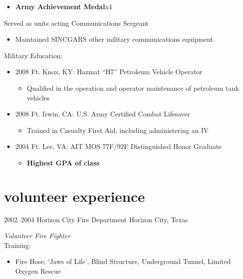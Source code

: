 \documentclass[]{friggeri-cv} %
\begin{document}
\begin{entrylist}
{\begin{itemize}
\item \textbf{Army Achievement Medal}x4
\end{itemize}
Served as units acting Communications Sergeant
\begin{itemize}
\item Maintained SINCGARS other military communications equipment.
\end{itemize}
Military Education:
\begin{itemize}
\item 2008 Ft. Knox, KY: Hazmat “H7” Petroleum Vehicle Operator
\begin{itemize}
\item Qualified in the operation and operator maintenance of petroleum tank vehicles
\end{itemize}
\item 2008 Ft. Irwin, CA: U.S. Army Certified Combat Lifesaver
\begin{itemize}
\item Trained in Casualty First Aid, including administering an IV
\end{itemize}
\item 2004 Ft. Lee, VA: AIT MOS 77F/92F Distinguished Honor Graduate
\begin{itemize}
\item \textbf{Highest GPA of class}
\end{itemize}
\end{itemize}}
\end{entrylist}



\section{volunteer experience}

\begin{entrylist}
\entry
{2002--2004}
{Horizon City Fire Department}
{Horizon City, Texas}
{\emph{Volunteer Fire Fighter} \\
Training:
\begin{itemize}
\item Fire Hose, ‘Jaws of Life’, Blind Structure, Underground Tunnel, Limited Oxygen Rescue
\end{itemize}}
\end{entrylist}
\end{document}
